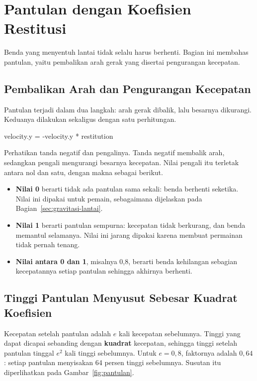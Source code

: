 \section{Pantulan dengan Koefisien Restitusi}
\label{sec:pantulan}

Benda yang menyentuh lantai tidak selalu harus berhenti. Bagian ini membahas
pantulan, yaitu pembalikan arah gerak yang disertai pengurangan kecepatan.

\subsection{Pembalikan Arah dan Pengurangan Kecepatan}

Pantulan terjadi dalam dua langkah: arah gerak dibalik, lalu besarnya
dikurangi. Keduanya dilakukan sekaligus dengan satu perhitungan.

\begin{kodekeluaran}
velocity.y = -velocity.y * restitution
\end{kodekeluaran}

Perhatikan tanda negatif dan pengalinya. Tanda negatif membalik arah, sedangkan
pengali  mengurangi besarnya kecepatan. Nilai pengali itu
terletak antara nol dan satu, dengan makna sebagai berikut.

\begin{itemize}
  \item \textbf{Nilai 0} berarti tidak ada pantulan sama sekali: benda
        berhenti seketika. Nilai ini dipakai untuk pemain, sebagaimana
        dijelaskan pada Bagian~\ref{sec:gravitasi-lantai}.
  \item \textbf{Nilai 1} berarti pantulan sempurna: kecepatan tidak
        berkurang, dan benda memantul selamanya. Nilai ini jarang dipakai
        karena membuat permainan tidak pernah tenang.
  \item \textbf{Nilai antara 0 dan 1}, misalnya 0,8, berarti benda kehilangan
        sebagian kecepatannya setiap pantulan sehingga akhirnya berhenti.
\end{itemize}

\subsection{Tinggi Pantulan Menyusut Sebesar Kuadrat Koefisien}

Kecepatan setelah pantulan adalah $e$ kali kecepatan sebelumnya. Tinggi yang
dapat dicapai sebanding dengan \textbf{kuadrat} kecepatan, sehingga tinggi
setelah pantulan tinggal $e^2$ kali tinggi sebelumnya. Untuk $e = 0{,}8$,
faktornya adalah $0{,}64$: setiap pantulan menyisakan 64 persen tinggi
sebelumnya. Susutan itu diperlihatkan pada Gambar~\ref{fig:pantulan}.

